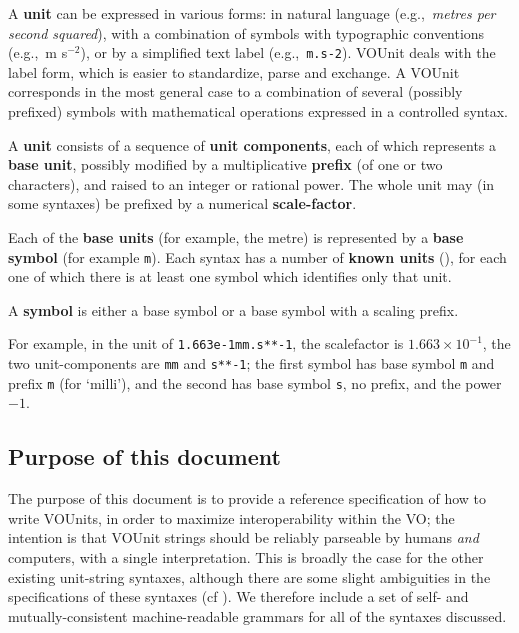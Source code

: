 \documentclass[11pt,notitlepage,onecolumn]{ivoa}
\def\eg{e.g.,~}
\newcommand{\unit}[1]{\texttt{\small\color{orange}#1}}
\begin{document}
A \textbf{unit} can be expressed in various forms: in natural language
(\eg \emph{metres per second squared}), with a combination of symbols
with typographic conventions (\eg m s$^{-2}$), or by a simplified text
label (\eg \unit{m.s-2}). VOUnit deals with the label form, which is
easier to standardize, parse and exchange. A VOUnit corresponds in the
most general case to a combination of several (possibly prefixed)
symbols with mathematical operations expressed in a controlled syntax.

A \textbf{unit} consists of a sequence of \textbf{unit components},
each of which represents a \textbf{base unit}, possibly modified by a
multiplicative \textbf{prefix} (of one or two characters), and raised
to an integer or rational power.  The whole unit may (in some
syntaxes) be prefixed by a numerical \textbf{scale-factor}.

Each of the \textbf{base units} (for example, the metre) is
represented by a \textbf{base symbol} (for example \unit{m}).  Each
syntax has a number of \textbf{known units}
(), for each one of which there is at least
one symbol which identifies only that unit.

A \textbf{symbol} is either a base symbol or a base symbol with a
scaling prefix.

For example, in the unit of \unit{1.663e-1mm.s**-1}, the scalefactor
is $1.663\times10^{-1}$, the two unit-components are \texttt{mm}
and \texttt{s**-1}; the first symbol has base symbol \texttt{m} and
prefix \texttt{m} (for `milli'), and the second has base
symbol \texttt{s}, no prefix, and the power~$-1$.



\subsection{Purpose of this document}
\label{sec:purpose}

The purpose of this document is to provide a reference specification of how
to write VOUnits, in order to maximize interoperability within the VO;
the intention is that VOUnit strings should be reliably
parseable by humans \emph{and} computers, with a single interpretation.
This is broadly the case for the other existing
unit-string syntaxes, although there are some slight ambiguities in
the specifications of these syntaxes (cf ).
We therefore include a set of self- and mutually-consistent
machine-readable grammars for all of the syntaxes discussed.
\end{document}
